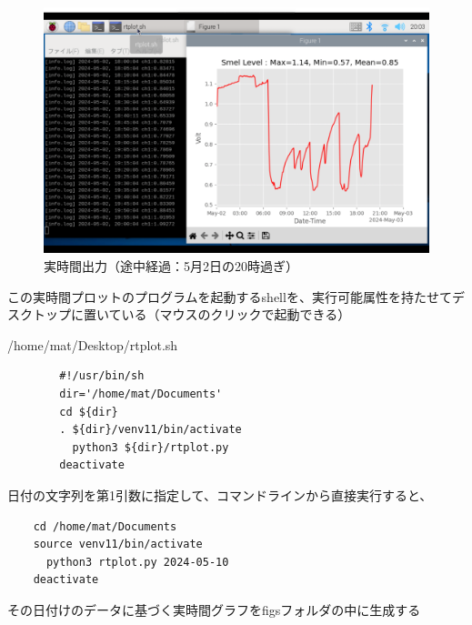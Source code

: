 \documentclass[12pt,a4paper,uplatex]{jsarticle}
\begin{document}
\begin{figure}[htbp]
	\begin{minipage}[b]{1.0\linewidth}
		\centering
		\includegraphics[keepaspectratio, scale=0.26]{figs/png/screen2.png}
		\caption{実時間出力（途中経過：5月2日の20時過ぎ）}
	\end{minipage}
\end{figure}

この実時間プロットのプログラムを起動するshellを、実行可能属性を持たせてデスクトップに置いている（マウスのクリックで起動できる）

\begin{itembox}[l]{/home/mat/Desktop/rtplot.sh}
	\begin{verbatim}
		#!/usr/bin/sh
		dir='/home/mat/Documents'
		cd ${dir}
		. ${dir}/venv11/bin/activate
		  python3 ${dir}/rtplot.py
		deactivate
	\end{verbatim}
\end{itembox}

日付の文字列を第1引数に指定して、コマンドラインから直接実行すると、
\begin{verbatim}
	cd /home/mat/Documents
	source venv11/bin/activate
	  python3 rtplot.py 2024-05-10
	deactivate
\end{verbatim}
その日付けのデータに基づく実時間グラフをfigsフォルダの中に生成する

\end{document}
